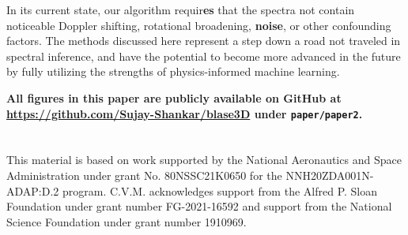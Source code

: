 \documentclass[twocolumn, linenumbers]{aastex631}
\begin{document}
In its current state, our algorithm requir\textbf{es} that the spectra not contain noticeable Doppler shifting, rotational broadening, \textbf{noise}, or other confounding factors.
The methods discussed here represent a step down a road not traveled in spectral inference, and have the potential to become more advanced in the future by fully utilizing the strengths of physics-informed machine learning.

\textbf{All figures in this paper are publicly available on GitHub at \url{https://github.com/Sujay-Shankar/blase3D} under \texttt{paper/paper2}.}

\section*{}
This material is based on work supported by the National Aeronautics and Space Administration under grant No. 80NSSC21K0650 for the NNH20ZDA001N-ADAP:D.2 program. C.V.M. acknowledges support from the Alfred P. Sloan Foundation under grant number FG-2021-16592 and support from the National Science Foundation under grant number 1910969.
\vspace*{0.5cm}



\end{document}

